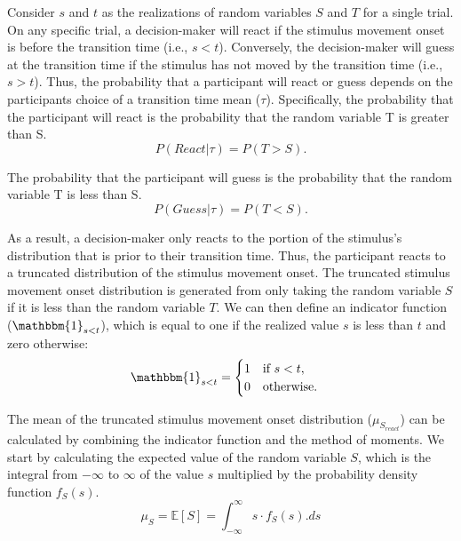 \documentclass[12pt]{article}
\begin{document}
Consider $s$ and $t$ as the realizations of random variables $S$ and $T$ for a single trial. On any specific trial, a decision-maker will react if the stimulus movement onset is before the transition time (i.e., $s<t$). Conversely, the decision-maker will guess at the transition time if the stimulus has not moved by the transition time (i.e., $s>t$). Thus, the probability that a participant will react or guess depends on the participants choice of a transition time mean ($\tau$). Specifically, the probability that the participant will react is the probability that the random variable T is greater than S.
\begin{equation}
    P(React|\tau) = P(T>S).
\end{equation}

The probability that the participant will guess is the probability that the random variable T is less than S.
\begin{equation}
    P(Guess|\tau) = P(T<S).
\end{equation}

As a result, a decision-maker only reacts to the portion of the stimulus’s distribution that is prior to their transition time. Thus, the participant reacts to a truncated distribution of the stimulus movement onset. The truncated stimulus movement onset distribution is generated from only taking the random variable $S$ if it is less than the random variable $T$. We can then define an indicator function ($\mathbbm{1}_{s<t}$), which is equal to one if the realized value $s$ is less than $t$ and zero otherwise:
\begin{align}
     & \mathbbm{1}_{s<t} =
    \begin{cases}
        1 & \text{if } s < t, \\
        0 & \text{otherwise.}
    \end{cases}
\end{align}

The mean of the truncated stimulus movement onset distribution ($\mu_{S_{react}}$) can be calculated by combining the indicator function and the method of moments. We start by calculating the expected value of the random variable $S$, which is the integral from $-\infty$ to $\infty$ of the value $s$ multiplied by the probability density function $f_{S}(s)$.
\begin{equation}
    \mu_{S} = \mathbb{E}[S] = \int_{-\infty}^{\infty}s \cdot f_{S}(s).ds
\end{equation}
\end{document}
